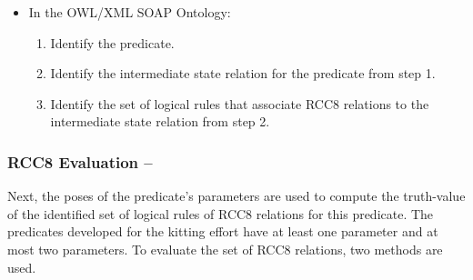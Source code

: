 \begin{itemize}
\item[] In the \textsf{OWL/XML SOAP Ontology}:
\begin{enumerate}
 \item Identify the predicate.
 \item Identify the intermediate state relation for the predicate from step 1.
 \item Identify the set of logical rules that associate RCC8 relations to the intermediate state relation from step 2.
\end{enumerate}
\end{itemize}

\subsubsection{RCC8 Evaluation -- }
Next, the poses of the predicate's parameters are used to compute the truth-value of the identified set of logical rules of RCC8 relations for this predicate. The predicates developed for the kitting effort have at least one parameter and at most two parameters. To evaluate the set of RCC8 relations, two methods are used. 


